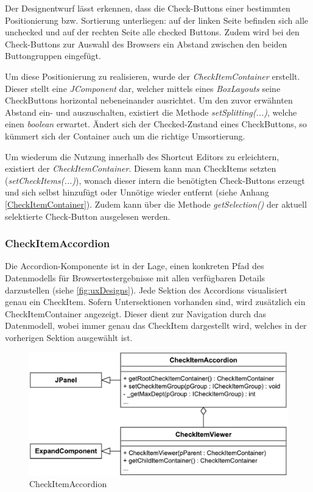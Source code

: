 Der Designentwurf lässt erkennen, dass die Check-Buttons einer bestimmten Positionierung bzw. Sortierung unterliegen: auf der linken Seite befinden sich alle unchecked und auf der rechten Seite alle checked Buttons. Zudem wird bei den Check-Buttons zur Auswahl des Browsers ein Abstand zwischen den beiden Buttongruppen eingefügt. 

Um diese Positionierung zu realisieren, wurde der \emph{CheckItemContainer} erstellt. Dieser stellt eine \emph{JComponent} dar, welcher mittels eines \emph{BoxLayouts} seine CheckButtons horizontal nebeneinander ausrichtet. Um den zuvor erwähnten Abstand ein- und auszuschalten, existiert die Methode \emph{setSplitting(...)}, welche einen \emph{boolean} erwartet. Ändert sich der Checked-Zustand eines CheckButtons, so kümmert sich der Container auch um die richtige Umsortierung.

Um wiederum die Nutzung innerhalb des Shortcut Editors zu erleichtern, existiert der \emph{CheckItemContainer}. Diesem kann man CheckItems setzten (\emph{setCheckItems(...)}), wonach dieser intern die benötigten Check-Buttons erzeugt und sich selbst hinzufügt oder Unnötige wieder entfernt (siehe Anhang \ref{CheckItemContainer}). Zudem kann über die Methode \emph{getSelection()} der aktuell selektierte Check-Button ausgelesen werden.

\subsubsection{CheckItemAccordion}

\vspace{-8px}

Die Accordion-Komponente ist in der Lage, einen konkreten Pfad des Datenmodells für Browsertestergebnisse mit allen verfügbaren Details darzustellen (siehe \autoref{fig:uxDesigns}).
Jede Sektion des Accordions visualisiert genau ein CheckItem. Sofern Untersektionen vorhanden sind, wird zusätzlich ein CheckItemContainer angezeigt. Dieser dient zur Navigation durch das Datenmodell, wobei immer genau das CheckItem dargestellt wird, welches in der vorherigen Sektion ausgewählt ist.

\begin{figure}
	\vspace{-12px}
	\centering
	\includegraphics[width=0.95\linewidth]{../graphic/diagrams/CD_CheckItemAccordion/CheckItemAccordion}
	\caption{CheckItemAccordion}
	\label{fig:checkitemaccordion}
\end{figure}


